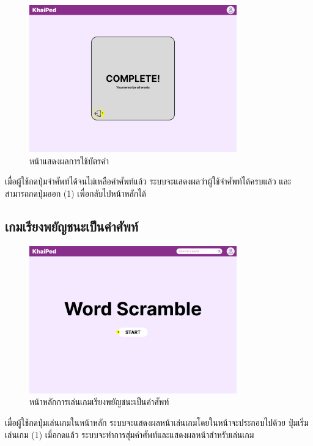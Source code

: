 \documentclass[12pt,oneside,openright,a4paper]{cpe-thai-project}
\begin{document}
\begin{figure}[!h]\centering
	\includegraphics[width=0.8\textwidth, keepaspectratio=true]{image/chap3/ui/flashcard/Flashcard - Complete.png}
	\caption{หน้าแสดงผลการใช้บัตรคำ}\label{fig:UI_SelectFlashcard1}
\end{figure}
\hspace{1cm}
เมื่อผู้ใช้กดปุ่มจำศัพท์ได้จนไม่เหลือคำศัพท์แล้ว ระบบจะแสดงผลว่าผู้ใช้จำศัพท์ได้ครบแล้ว และสามารถกดปุ่มออก (1) เพื่อกลับไปหน้าหลักได้

\pagebreak
\subsection{เกมเรียงพยัญชนะเป็นคำศัพท์}
\begin{figure}[!h]\centering
	\includegraphics[width=0.8\textwidth, keepaspectratio=true]{image/chap3/ui/game/Word Scramble.png}
	\caption{หน้าหลักการเล่นเกมเรียงพยัญชนะเป็นคำศัพท์}\label{fig:UI_Game}
\end{figure}
\hspace{1cm}
เมื่อผู้ใช้กดปุ่มเล่นเกมในหน้าหลัก ระบบจะแสดงผลหน้าเล่นเกมโดยในหน้าจะประกอบไปด้วย
ปุ่มเริ่มเล่นเกม (1) เมื่อกดแล้ว ระบบจะทำการสุ่มคำศัพท์และแสดงผลหน้าสำหรับเล่นเกม
\end{document}

